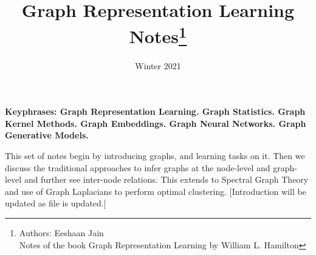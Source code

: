 \documentclass[nobib]{tufte-handout}
\title{Graph Representation Learning\\
       \Large Notes\thanks{Authors: Eeshaan Jain \\ Notes of the book Graph Representation Learning by William L. Hamilton}}
\date{Winter 2021} %
\newtheorem[M]{definition}{Definition}[section]
\begin{document}
\maketitle%



\textbf{Keyphrases: Graph Representation Learning. Graph Statistics. Graph Kernel Methods. Graph Embeddings. Graph Neural Networks. Graph Generative Models.}

This set of notes begin by introducing graphs, and learning tasks on it. Then we discuss the traditional approaches to infer graphs at the node-level and graph-level and further see inter-node relations. This extends to Spectral Graph Theory and use of Graph Laplacians to perform optimal clustering. [Introduction will be updated as file is updated.]
\tableofcontents





\nocite{*}
\footnotesize


\end{document}

